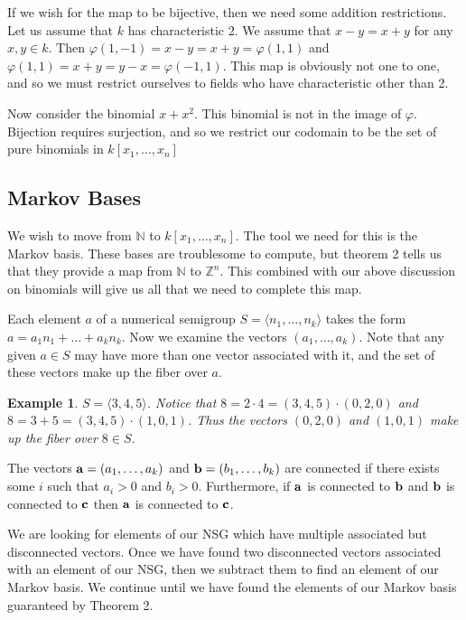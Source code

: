 \documentclass[11pt]{amsart}
\theoremstyle{plain}
\newtheorem{exa}{Example}
\theoremstyle{definition}
\begin{document}
If we wish for the map to be bijective, then we need some addition restrictions. Let us assume that $k$ has characteristic 2. We assume that $x-y=x+y$ for any $x,y\in k$. Then $\varphi(1,-1)=x-y=x+y=\varphi(1,1)$ and $\varphi(1,1)=x+y=y-x=\varphi(-1,1)$. This map is obviously not one to one, and so we must restrict ourselves to fields who have characteristic other than 2.

Now consider the binomial $x+x^2$. This binomial is not in the image of $\varphi$. Bijection requires surjection, and so we restrict our codomain to be the set of pure binomials in $k[x_1,\dots,x_n]$

\subsection{Markov Bases}
We wish to move from $\mathbb{N}$ to $k[x_1,\dots,x_n]$. The tool we need for this is the Markov basis. These bases are troublesome to compute, but theorem 2 tells us that they provide a map from $\mathbb{N}$ to $\mathbb{Z}^n$. This combined with our above discussion on binomials will give us all that we need to complete this map.

Each element $a$ of a numerical semigroup $S=\langle n_1,\dots,n_k\rangle$ takes
the form $a=a_1n_1+\dots+a_kn_k$. Now we examine the vectors $(a_1,\dots,a_k)$.
Note that any given $a\in S$ may have more than one vector associated with it, and the set of these vectors make up the fiber over $a$.
\begin{exa}
  $S=\langle 3,4,5\rangle$.
  Notice that $8=2\cdot 4=(3,4,5)\cdot(0,2,0)$ and $8=3+5=(3,4,5)\cdot(1,0,1)$.
  Thus the vectors $(0,2,0)$ and $(1,0,1)$ make up the fiber over $8\in S$.
\end{exa}
The vectors ${\bf a}=(a_1,\dots,a_k)$
and ${\bf b}=(b_1,\dots,b_k)$ are connected if there exists some $i$
such that $a_i>0$ and $b_i>0$. Furthermore, if ${\bf a}$ is connected to
${\bf b}$ and ${\bf b}$ is connected to ${\bf c}$ then ${\bf a}$ is connected to
${\bf c}$.

We are looking for elements of our NSG which have multiple
associated but disconnected vectors. Once we have found two disconnected vectors associated with an
element of our NSG, then we subtract them to find an element
of our Markov basis. We continue until we have found the elements of our Markov
basis guaranteed by Theorem 2.
\end{document}

